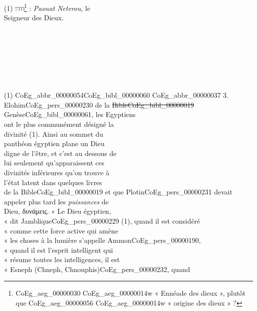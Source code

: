 \documentclass{book}
\begin{document}
{\begin{paracol}{2}
\noindent \\
\\
(1) \includegraphics[height=6pt]{CoEg_Mariette_hiero_1857-04-01_32.png}\footnote{\foreignlanguage{translit}{\Gls{CoEg_aeg_00000030} \gls{CoEg_aeg_00000014}w} « Ennéade des dieux », plutôt que \foreignlanguage{translit}{\gls{CoEg_aeg_00000056} \gls{CoEg_aeg_00000014}w} « origine des dieux » ?} : \textit{Paouat Neterou}, le\\
Seigneur des Dieux.\\
\\
\\
\\
\\
\\
\\
\\
(1) \Gls{CoEg_abbr_00000054}\gls{CoEg_bibl_00000060} \gls{CoEg_abbr_00000037} 3.
\switchcolumn
\noindent Elohim\gls{CoEg_pers_00000230} de la \sout{Bible\gls{CoEg_bibl_00000019}} Genèse\gls{CoEg_bibl_00000061}, les Egyptiens\\
ont le plus communément désigné la\\
divinité (1). Ainsi au sommet du\\
panthéon égyptien plane un Dieu\\
digne de l’être, et c’est au dessous de\\
lui seulement qu’apparaissent ces\\
divinités inférieures qu’on trouve à\\
l’état latent dans quelques livres\\
de la Bible\gls{CoEg_bibl_00000019} et que Plotin\gls{CoEg_pers_00000231} devait\\
appeler plus tard les \textit{puissances} de\\
Dieu, δυνάμεις. « Le Dieu égyptien,\\
« dit Jamblique\gls{CoEg_pers_00000229} (1), quand il est considéré\\
« comme cette force active qui amène\\
« les choses à la lumière s’appelle Ammon\gls{CoEg_pers_00000190},\\
« quand il est l’esprit intelligent qui\\
« résume toutes les intelligences, il est\\
« Esneph (Chneph, Chnouphis)\gls{CoEg_pers_00000232}, quand\\

\end{paracol}}
\end{document}
